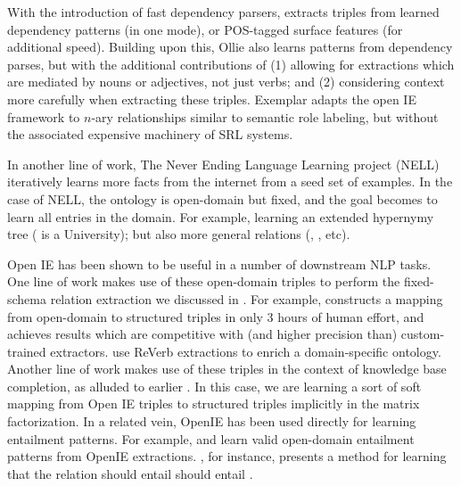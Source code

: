 With the introduction of fast dependency parsers,
  \cite{key:2010wu-openie} extracts triples from
  learned dependency patterns (in one mode), or POS-tagged surface features (for additional
  speed).
Building upon this, Ollie \cite{key:2012mausam-ollie} also learns patterns from dependency
  parses, but with the additional contributions of (1) allowing for extractions which are
  mediated by nouns or adjectives, not just verbs; and (2) considering context more carefully
  when extracting these triples.
Exemplar \cite{key:2013mesquita-exemplar} adapts the open IE framework to
  $n$-ary relationships similar to semantic role labeling, but without the
  associated expensive machinery of SRL systems.

In another line of work, The Never Ending Language Learning project (NELL) \cite{key:2010carlson-nell}
  iteratively learns more facts from the internet
  from a seed set of examples.
In the case of NELL, the ontology is open-domain but fixed, and the goal becomes to learn
  all entries in the domain.
For example, learning an extended hypernymy tree ( is a University);
  but also more general relations (, , etc).


Open IE has been shown to be useful in a number of downstream NLP tasks.
One line of work makes use of these open-domain triples to perform
  the fixed-schema relation extraction we discussed in .
For example, \cite{key:2013soderland-kbp} constructs a mapping from open-domain
  to structured triples in only 3 hours of human effort, and achieves results
  which are competitive with (and higher precision than) custom-trained
  extractors.
 use ReVerb extractions to 
    enrich a domain-specific ontology.
Another line of work makes use of these triples in the context of knowledge
  base completion, as alluded to earlier \cite{key:2012yao-schemas,key:2013riedel-schemas}.
In this case, we are learning a sort of soft mapping from Open IE triples to
  structured triples implicitly in the matrix factorization.
In a related vein, OpenIE has been used directly for learning entailment patterns.
For example,  and 
  learn valid open-domain entailment patterns from OpenIE extractions.
, for instance, presents a method for learning
  that the relation  should entail  should entail
  .

